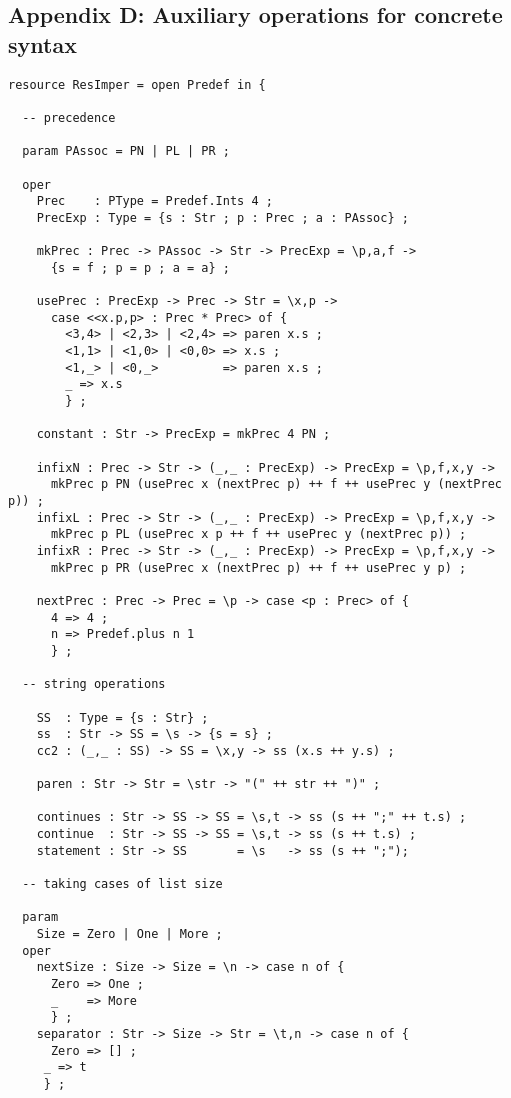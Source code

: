 \documentclass[12pt]{article}
\begin{document}
\subsection*{Appendix D: Auxiliary operations for concrete syntax}

\small
\begin{verbatim}
resource ResImper = open Predef in {

  -- precedence

  param PAssoc = PN | PL | PR ;

  oper 
    Prec    : PType = Predef.Ints 4 ;
    PrecExp : Type = {s : Str ; p : Prec ; a : PAssoc} ;

    mkPrec : Prec -> PAssoc -> Str -> PrecExp = \p,a,f -> 
      {s = f ; p = p ; a = a} ;

    usePrec : PrecExp -> Prec -> Str = \x,p ->
      case <<x.p,p> : Prec * Prec> of {
        <3,4> | <2,3> | <2,4> => paren x.s ;
        <1,1> | <1,0> | <0,0> => x.s ;
        <1,_> | <0,_>         => paren x.s ;
        _ => x.s
        } ;

    constant : Str -> PrecExp = mkPrec 4 PN ;

    infixN : Prec -> Str -> (_,_ : PrecExp) -> PrecExp = \p,f,x,y ->
      mkPrec p PN (usePrec x (nextPrec p) ++ f ++ usePrec y (nextPrec p)) ;
    infixL : Prec -> Str -> (_,_ : PrecExp) -> PrecExp = \p,f,x,y ->
      mkPrec p PL (usePrec x p ++ f ++ usePrec y (nextPrec p)) ;
    infixR : Prec -> Str -> (_,_ : PrecExp) -> PrecExp = \p,f,x,y ->
      mkPrec p PR (usePrec x (nextPrec p) ++ f ++ usePrec y p) ;

    nextPrec : Prec -> Prec = \p -> case <p : Prec> of {
      4 => 4 ; 
      n => Predef.plus n 1
      } ;

  -- string operations

    SS  : Type = {s : Str} ;
    ss  : Str -> SS = \s -> {s = s} ;
    cc2 : (_,_ : SS) -> SS = \x,y -> ss (x.s ++ y.s) ;

    paren : Str -> Str = \str -> "(" ++ str ++ ")" ;

    continues : Str -> SS -> SS = \s,t -> ss (s ++ ";" ++ t.s) ; 
    continue  : Str -> SS -> SS = \s,t -> ss (s ++ t.s) ;
    statement : Str -> SS       = \s   -> ss (s ++ ";"); 

  -- taking cases of list size

  param
    Size = Zero | One | More ;
  oper
    nextSize : Size -> Size = \n -> case n of {
      Zero => One ;
      _    => More
      } ;
    separator : Str -> Size -> Str = \t,n -> case n of {
      Zero => [] ;
     _ => t
     } ;


\end{verbatim}
\end{document}
